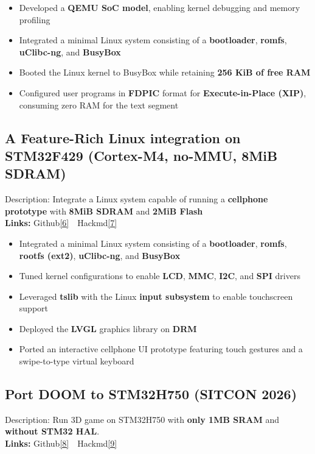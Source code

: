 \documentclass[11pt]{article}
\begin{document}
\begin{itemize}
  \item Developed a \textbf{QEMU SoC model}, enabling kernel debugging and memory profiling
  \item Integrated a minimal Linux system consisting of a \textbf{bootloader}, \textbf{romfs}, \textbf{uClibc-ng}, and \textbf{BusyBox}
  \item Booted the Linux kernel to BusyBox while retaining \textbf{256 KiB of free RAM}
  \item Configured user programs in \textbf{FDPIC} format for \textbf{Execute-in-Place (XIP)}, consuming zero RAM for the text segment
\end{itemize}

\subsection*{A Feature-Rich Linux integration on STM32F429 (Cortex-M4, no-MMU, 8MiB SDRAM)}
\vspace{1pt}
Description: Integrate a Linux system capable of running a \textbf{cellphone prototype} with \textbf{8MiB SDRAM} and \textbf{2MiB Flash}\\
{\small\textbf{Links:} Github\hyperlink{l6}{[6]}\ \ Hackmd\hyperlink{l7}{[7]}}
\begin{itemize}
  \item Integrated a minimal Linux system consisting of a \textbf{bootloader}, \textbf{romfs}, \textbf{rootfs (ext2)}, \textbf{uClibc-ng}, and \textbf{BusyBox}
  \item Tuned kernel configurations to enable \textbf{LCD}, \textbf{MMC}, \textbf{I2C}, and \textbf{SPI} drivers
  \item Leveraged \textbf{tslib} with the Linux \textbf{input subsystem} to enable touchscreen support
  \item Deployed the \textbf{LVGL} graphics library on \textbf{DRM}
  \item Ported an interactive cellphone UI prototype featuring touch gestures and a swipe-to-type virtual keyboard
\end{itemize}

\subsection*{Port DOOM to STM32H750 (SITCON 2026)}
\vspace{1pt}
Description: Run 3D game on STM32H750 with \textbf{only 1MB SRAM} and \textbf{without STM32 HAL}.\\
{\small\textbf{Links:} Github\hyperlink{l8}{[8]}\ \ Hackmd\hyperlink{l9}{[9]}}
\end{document}
